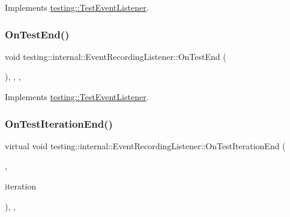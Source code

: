 Implements \mbox{\hyperlink{classtesting_1_1_test_event_listener_abb1c44525ef038500608b5dc2f17099b}{testing\+::\+Test\+Event\+Listener}}.

\mbox{\label{classtesting_1_1internal_1_1_event_recording_listener_ab374bf69a73cd7dd8fcef5aea1209728}} 
\subsubsection{\texorpdfstring{OnTestEnd()}{OnTestEnd()}\hspace{0.1cm}{\footnotesize\ttfamily [3/3]}}
{\footnotesize\ttfamily void testing\+::internal\+::\+Event\+Recording\+Listener\+::\+On\+Test\+End (\begin{DoxyParamCaption}\item[{const \mbox{\hyperlink{classtesting_1_1_test_info}{Test\+Info}} \&}]{ }\end{DoxyParamCaption})\hspace{0.3cm}{\ttfamily [inline]}, {\ttfamily [override]}, {\ttfamily [protected]}, {\ttfamily [virtual]}}



Implements \mbox{\hyperlink{classtesting_1_1_test_event_listener_abb1c44525ef038500608b5dc2f17099b}{testing\+::\+Test\+Event\+Listener}}.

\mbox{\label{classtesting_1_1internal_1_1_event_recording_listener_ab0cc007bcfaf06cd383d574c88f62aea}} 
\subsubsection{\texorpdfstring{OnTestIterationEnd()}{OnTestIterationEnd()}\hspace{0.1cm}{\footnotesize\ttfamily [1/3]}}
{\footnotesize\ttfamily virtual void testing\+::internal\+::\+Event\+Recording\+Listener\+::\+On\+Test\+Iteration\+End (\begin{DoxyParamCaption}\item[{const \mbox{\hyperlink{classtesting_1_1_unit_test}{Unit\+Test}} \&}]{,  }\item[{int}]{iteration }\end{DoxyParamCaption})\hspace{0.3cm}{\ttfamily [inline]}, {\ttfamily [protected]}, {\ttfamily [virtual]}}



